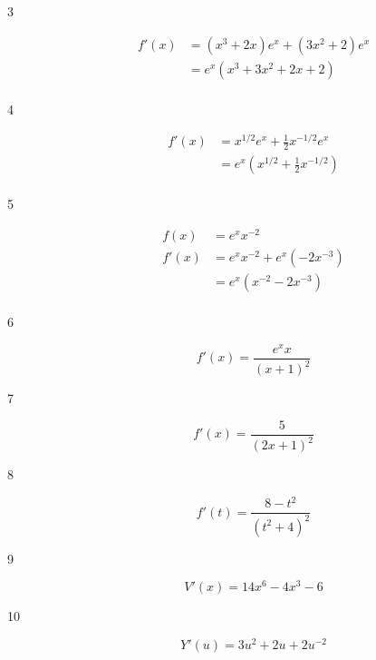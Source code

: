\documentclass[letterpaper, landscape]{exam}
\begin{document}
  \begin{description}

    \item[3] 
      \begin{align*}
        f'(x) & = \left( x^3 + 2x \right) e^x + \left( 3x^2 + 2 \right) e^x \\
              & = \boxed{ e^x \left( x^3 + 3x^2 + 2x + 2 \right) } \\
      \end{align*}

    \item[4] 
      \begin{align*}
        f'(x) & = x^{1/2} e^x + \frac{1}{2} x^{-1/2} e^x \\
        & = \boxed{ e^x \left( x^{1/2} + \frac{1}{2} x^{-1/2} \right) } \\
      \end{align*}

    \item[5] 
      \begin{align*}
        f(x)  & = e^x x^{-2} \\
        f'(x) & = e^x x^{-2} + e^x \left( -2 x^{-3} \right) \\
              & = \boxed{ e^x \left( x^{-2} -2 x^{-3} \right) } \\
      \end{align*}

    \item[6] 
      \[
        f'(x) = \boxed{ \frac{e^x x}{(x + 1)^2} }      
      \]

    \item[7] 
      \[
        f'(x) = \boxed{ \frac{5}{(2x + 1)^2} }
      \]

    \item[8] 
      \[
        f'(t) = \boxed{ \frac{ 8 - t^2 }{\left( t^2 + 4 \right)^2} }
      \]
      
    \item[9] 
      \[
        V'(x) = \boxed{ 14x^6 - 4x^3 - 6 } 
      \]
      
    \item[10] 
      \[
        Y'(u) = \boxed{ 3u^2 + 2u + 2u^{-2} } 
      \]
      
      


\end{description}
\end{document}

